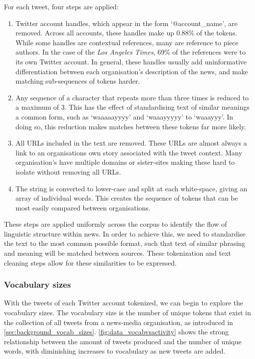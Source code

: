For each tweet, four steps are applied:
\begin{enumerate}
	\item Twitter account handles, which appear in the form `@account\_name', are removed. Across all accounts, these handles make up 0.88\% of the tokens. While some handles are contextual references, many are reference to piece authors. In the case of the \emph{Los Angeles Times}, 69\% of the references were to its own Twitter account. In general, these handles usually add uninformative differentiation between each organisation's description of the news, and make matching sub-sequences of tokens harder.
	\item Any sequence of a character that repeats more than three times is reduced to a maximum of 3. This has the effect of standardising text of similar meanings a common form, such as `waaaaayyyy' and `waaayyyyy' to `waaayyy'. In doing so, this reduction makes matches between these tokens far more likely.
	\item All URLs included in the text are removed. These URLs are almost always a link to an organisations own story associated with the tweet context. Many organisation's have multiple domains or sister-sites making these hard to isolate without removing all URLs.  
	\item The string is converted to lower-case and split at each white-space, giving an array of individual words. This creates the sequence of tokens that can be most easily compared between organisations.
\end{enumerate}

These steps are applied uniformly across the corpus to identify the flow of linguistic structure within news. In order to achieve this, we need to standardise the text to the most common possible format, such that text of similar phrasing and meaning will be matched between sources. These tokenization and text cleaning steps allow for these similarities to be expressed.


\subsubsection{Vocabulary sizes}\label{sec:vocabsizes}

With the tweets of each Twitter account tokenized, we can begin to explore the vocabulary sizes. The vocabulary size is the number of unique tokens that exist in the collection of all tweets from a news-media organisation, as introduced in \autoref{sec:background_vocab_sizes}. \autoref{fig:data_vocabvsactivity} shows the strong relationship between the amount of tweets produced and the number of unique words, with diminishing increases to vocabulary as new tweets are added.

